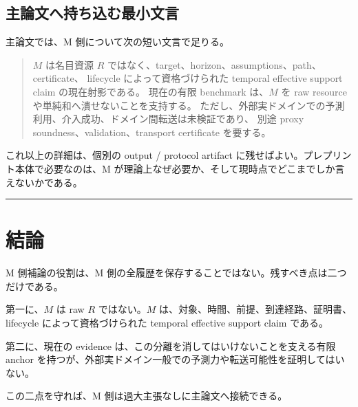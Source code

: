 \documentclass[12pt,a4paper]{article}
\begin{document}
\subsection{主論文へ持ち込む最小文言}\label{ux4e3bux8ad6ux6587ux3078ux6301ux3061ux8fbcux3080ux6700ux5c0fux6587ux8a00}

主論文では、M 側について次の短い文言で足りる。

\begin{quote}
\(M\) は名目資源 \(R\) ではなく、target、horizon、assumptions、path、certificate、 lifecycle によって資格づけられた temporal effective support claim の現在射影である。 現在の有限 benchmark は、\(M\) を raw resource や単純和へ潰せないことを支持する。 ただし、外部実ドメインでの予測利用、介入成功、ドメイン間転送は未検証であり、 別途 proxy soundness、validation、transport certificate を要する。
\end{quote}

これ以上の詳細は、個別の output / protocol artifact に残せばよい。プレプリント本体で必要なのは、M が理論上なぜ必要か、そして現時点でどこまでしか言えないかである。

\begin{center}\rule{0.5\linewidth}{0.5pt}\end{center}

\section{結論}\label{ux7d50ux8ad6}

M 側補論の役割は、M 側の全履歴を保存することではない。残すべき点は二つだけである。

第一に、\(M\) は raw \(R\) ではない。\(M\) は、対象、時間、前提、到達経路、証明書、lifecycle によって資格づけられた temporal effective support claim である。

第二に、現在の evidence は、この分離を消してはいけないことを支える有限 anchor を持つが、外部実ドメイン一般での予測力や転送可能性を証明してはいない。

この二点を守れば、M 側は過大主張なしに主論文へ接続できる。
\end{document}
